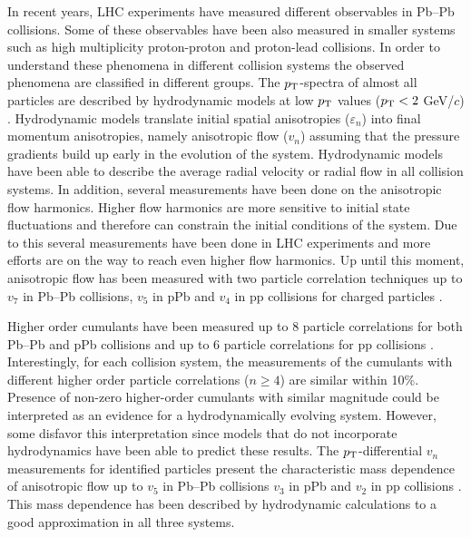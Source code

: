 \documentclass[../report.tex]{subfiles}
\begin{document}
In recent years, LHC experiments have measured different observables in Pb--Pb collisions. Some of these observables have been also measured in smaller systems such as high multiplicity proton-proton and proton-lead collisions. In order to understand these phenomena in different collision systems the observed phenomena are classified in different groups. The $p_{\rm{T}}$-spectra of almost all particles are described by hydrodynamic models at low $p_{\rm{T}}$ values ($p_{\rm{T}} < 2 $ GeV/$c$) \cite{Abelev:2012wca,Abelev:2013vea,Chatrchyan:2013eya,Chatrchyan:2012qb,Andrei:2014vaa,Abelev:2013haa,Acharya:2017dmc,Adam:2016bpr,Adam:2015vsf,Adam:2017zbf}. Hydrodynamic models translate initial spatial anisotropies ($\varepsilon_n$) into final momentum anisotropies, namely anisotropic flow ($v_{n}$) assuming that the pressure gradients build up early in the evolution of the system. Hydrodynamic models have been able to describe the average radial velocity or radial flow in all collision systems. In addition, several measurements have been done on the anisotropic flow harmonics. Higher flow harmonics are more sensitive to initial state fluctuations and therefore can constrain the initial conditions of the system. Due to this several measurements have been done in LHC experiments and more efforts are on the way to reach even higher flow harmonics. Up until this moment, anisotropic flow has been measured with two particle correlation techniques up to $v_7$ in Pb--Pb collisions, $v_5$ in pPb and $v_4$ in pp collisions for charged particles \cite{CMS:2012qk,Abelev:2012ola,Aad:2012gla,Aamodt:2011by,Chatrchyan:2011eka,Chatrchyan:2012wg,ATLAS:2012at,Aad:2014lta,Aad:2015gqa,CMS:2015zpa,Khachatryan:2016txc,Acharya:2017ino,Adam:2016ows,Adam:2016nfo,Acharya:2018zuq,Sirunyan:2017uyl,Aaboud:2017acw}.

Higher order cumulants have been measured up to 8 particle correlations for both Pb--Pb and pPb collisions and up to 6 particle correlations for pp collisions \cite{Aad:2013fja,Chatrchyan:2013nka,Khachatryan:2016txc,Aamodt:2010pa,ALICE:2011ab,Chatrchyan:2012ta,Abelev:2014mda,Chatrchyan:2013kba,Aad:2014vba,Khachatryan:2015waa,Adam:2016izf,CMS:2015ica,Sirunyan:2017pan,Sirunyan:2017igb,Aaboud:2017acw,Aaboud:2017blb}. Interestingly, for each collision system, the measurements of the cumulants with different higher order particle correlations ($n \geq 4$) are similar within 10\%. Presence of non-zero higher-order cumulants with similar magnitude could be interpreted as an evidence for a hydrodynamically evolving system. However, some disfavor this interpretation since models that do not incorporate hydrodynamics have been able to predict these results. The $p_{\rm{T}}$-differential $v_{n}$ measurements for identified particles present the characteristic mass dependence of anisotropic flow up to $v_{5}$ in Pb--Pb collisions $v_{3}$ in pPb and $v_{2}$ in pp collisions \cite{Abelev:2014pua,Abelev:2012di,Adam:2016nfo,Khachatryan:2014jra,ABELEV:2013wsa,CMS:2015kua,Khachatryan:2016txc,Acharya:2018zuq}. This mass dependence has been described by hydrodynamic calculations to a good approximation in all three systems.
\end{document}

